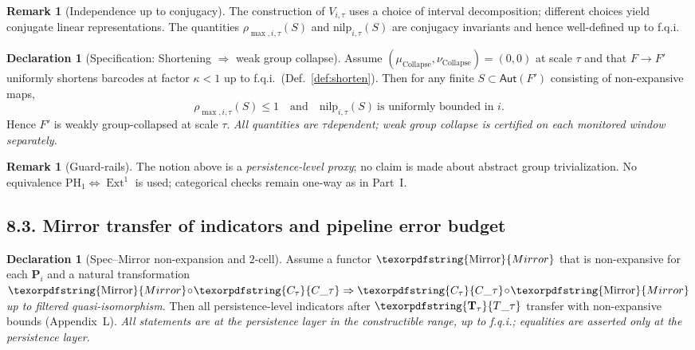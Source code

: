 \documentclass[11pt]{article}
\numberwithin{equation}{section}
\theoremstyle{plain}
\theoremstyle{definition}
\theoremstyle{remark}
\DeclareMathOperator{\Ext}{Ext}
\DeclareRobustCommand{\hyp}{\nobreakdash-}
\theoremstyle{plain}
\theoremstyle{definition}
\numberwithin{equation}{section}
\theoremstyle{definition}
\newtheorem{remark}[theorem]{Remark}
\newtheorem{declaration}[theorem]{Declaration}
\DeclareRobustCommand{\Ttau}{\texorpdfstring{\ensuremath{\mathbf{T}_{\tau}}}{T\_\tau}}
\DeclareRobustCommand{\Ctau}{\texorpdfstring{\ensuremath{C_{\tau}}}{C\_\tau}}
\DeclareRobustCommand{\Mirror}{\texorpdfstring{\ensuremath{\operatorname{Mirror}}}{Mirror}}
\numberwithin{equation}{section}
\theoremstyle{plain}
\theoremstyle{definition}
\theoremstyle{remark}
\providecommand{\Cfun}[1]{\mathsf{C}_{#1}}
\providecommand{\Tfun}[1]{\mathbf{T}_{#1}}
\providecommand{\Ctau}{\Cfun{\tau}}
\providecommand{\Ttau}{\Tfun{\tau}}
\begin{document}
\begin{remark}[Independence up to conjugacy]\label{rk:conj-inv}
The construction of \(V_{i,\tau}\) uses a choice of interval decomposition; different choices yield conjugate linear representations.
The quantities \(\rho_{\max,i,\tau}(S)\) and \(\mathrm{nilp}_{i,\tau}(S)\) are conjugacy invariants and hence well\hyp defined up to f.q.i.
\end{remark}

\begin{declaration}[Specification: Shortening \(\Rightarrow\) weak group collapse]\label{spec:short-to-weak}
Assume \((\mu_{\mathrm{Collapse}},\nu_{\mathrm{Collapse}})=(0,0)\) at scale \(\tau\) and that \(F\to F'\) uniformly shortens barcodes at factor \(\kappa<1\) up to f.q.i.\ (Def.~\ref{def:shorten}).
Then for any finite \(S\subset \mathsf{Aut}(F')\) consisting of non\hyp expansive maps,
\[
  \rho_{\max,i,\tau}(S)\le 1\quad \text{and}\quad \mathrm{nilp}_{i,\tau}(S)\ \text{is uniformly bounded in \(i\)}.
\]
Hence \(F'\) is weakly group\hyp collapsed at scale \(\tau\).
\emph{All quantities are \(\tau\)\nobreakdash dependent; weak group collapse is certified on each monitored window separately.}
\end{declaration}

\begin{remark}[Guard\hyp rails]\label{rk:guard}
The notion above is a \emph{persistence\hyp level proxy}; no claim is made about abstract group trivialization.
No equivalence \(\mathrm{PH}_1\Leftrightarrow\Ext^1\) is used; categorical checks remain one\hyp way as in Part~I.
\end{remark}

\subsection*{8.3. Mirror transfer of indicators and pipeline error budget}
\begin{declaration}[Spec–Mirror non\hyp expansion and $2$-cell]\label{spec:mirror}
Assume a functor \(\Mirror\) that is non\hyp expansive for each \(\mathbf{P}_i\) and a natural transformation \(\Mirror\!\circ\! \Ctau \Rightarrow \Ctau\!\circ\!\Mirror\) \emph{up to filtered quasi\hyp isomorphism}.
Then all persistence\hyp level indicators after \(\Ttau\) transfer with non\hyp expansive bounds (Appendix~L).
\emph{All statements are at the persistence layer in the constructible range, up to f.q.i.; equalities are asserted only at the persistence layer.}
\end{declaration}
\end{document}
